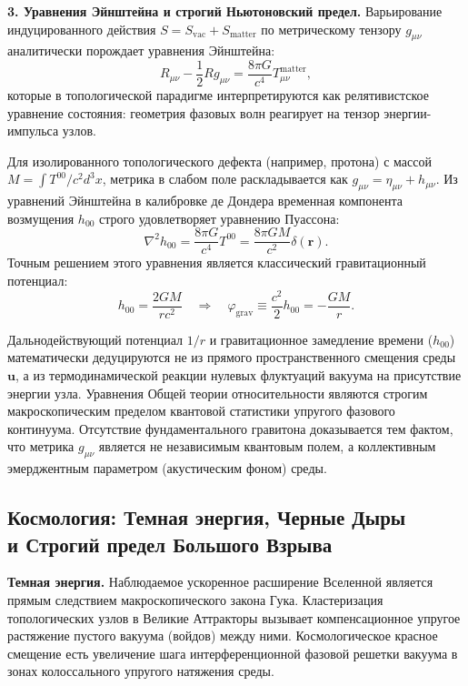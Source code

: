 \documentclass[11pt,a4paper]{article}
\begin{document}
	\textbf{3. Уравнения Эйнштейна и строгий Ньютоновский предел.}
	Варьирование индуцированного действия $S = S_{\text{vac}} + S_{\text{matter}}$ по метрическому тензору $g_{\mu\nu}$ аналитически порождает уравнения Эйнштейна:
	\begin{equation}
		R_{\mu\nu} - \frac{1}{2}R g_{\mu\nu} = \frac{8\pi G}{c^4} T_{\mu\nu}^{\text{matter}},
	\end{equation}
	которые в топологической парадигме интерпретируются как релятивистское уравнение состояния: геометрия фазовых волн реагирует на тензор энергии-импульса узлов.
	
	Для изолированного топологического дефекта (например, протона) с массой $M = \int T^{00}/c^2 d^3x$, метрика в слабом поле раскладывается как $g_{\mu\nu} = \eta_{\mu\nu} + h_{\mu\nu}$. Из уравнений Эйнштейна в калибровке де Дондера временная компонента возмущения $h_{00}$ строго удовлетворяет уравнению Пуассона:
	\begin{equation}
		\nabla^2 h_{00} = \frac{8\pi G}{c^4} T^{00} = \frac{8\pi G M}{c^2} \delta(\mathbf{r}).
	\end{equation}
	Точным решением этого уравнения является классический гравитационный потенциал:
	\begin{equation}
		h_{00} = \frac{2 G M}{r c^2} \quad \Longrightarrow \quad \varphi_{\text{grav}} \equiv \frac{c^2}{2} h_{00} = - \frac{GM}{r}.
	\end{equation}
	
Дальнодействующий потенциал $1/r$ и гравитационное замедление времени ($h_{00}$) математически дедуцируются не из прямого пространственного смещения среды $\mathbf{u}$, а из термодинамической реакции нулевых флуктуаций вакуума на присутствие энергии узла. Уравнения Общей теории относительности являются строгим макроскопическим пределом квантовой статистики упругого фазового континуума. Отсутствие фундаментального гравитона доказывается тем фактом, что метрика $g_{\mu\nu}$ является не независимым квантовым полем, а коллективным эмерджентным параметром (акустическим фоном) среды.
	
	\subsection{Космология: Темная энергия, Черные Дыры\\ и Строгий предел Большого Взрыва}
	\textbf{Темная энергия.} Наблюдаемое ускоренное расширение Вселенной является прямым следствием макроскопического закона Гука. Кластеризация топологических узлов в Великие Аттракторы вызывает компенсационное упругое растяжение пустого вакуума (войдов) между ними. Космологическое красное смещение есть увеличение шага интерференционной фазовой решетки вакуума в зонах колоссального упругого натяжения среды.
	
\end{document}
